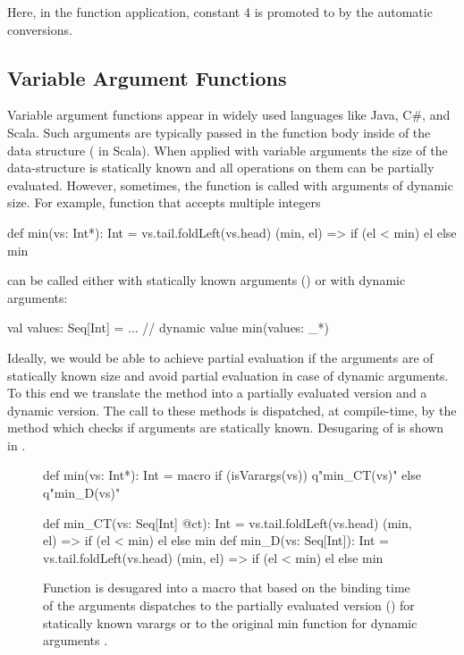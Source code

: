 Here, in the function application, constant 4 is promoted to  by the automatic
conversions. 

\subsection{Variable Argument Functions}
\label{sct:varargs}

Variable argument functions appear in widely used languages like Java, C\#, and Scala.
 Such arguments are typically passed in the function body inside of the data structure
 (\eg {} in Scala). When applied with variable arguments the size of the
 data-structure is statically known and all operations on them can be partially
 evaluated. However, sometimes, the function is called with arguments of dynamic size.
 For example, function  that accepts multiple integers\begin{lstparagraph}
def min(vs: Int*): Int = vs.tail.foldLeft(vs.head) {
  (min, el) => if (el < min) el else min
}
\end{lstparagraph}can be called either with statically known arguments
 (\eg {}) or with dynamic arguments:\begin{lstparagraph}
val values: Seq[Int] = ... // dynamic value
min(values: _*)
\end{lstparagraph}

Ideally, we would be able to achieve partial evaluation if the arguments are of statically
known size and avoid partial evaluation in case of dynamic arguments. To this end we translate
the method  into a partially evaluated version and a dynamic version. The call to these
methods is dispatched, at compile-time, by the  method which checks if
arguments are statically known. Desugaring of  is shown in .

\begin{figure}
\begin{listing}
def min(vs: Int*): Int = macro
  if (isVarargs(vs)) q"min_CT(vs)"
  else q"min_D(vs)"

def min_CT(vs: Seq[Int] @ct): Int =
  vs.tail.foldLeft(vs.head) { (min, el) =>
  if (el < min) el else min
}
def min_D(vs: Seq[Int]): Int =
  vs.tail.foldLeft(vs.head) {
    (min, el) => if (el < min) el else min
  }
\end{listing}
\caption{Function  is desugared into a  macro that based on the
binding time of the arguments dispatches to the partially evaluated version ()
for statically known varargs or to the original min function for dynamic arguments .}
\label{fig:min}
\end{figure}

